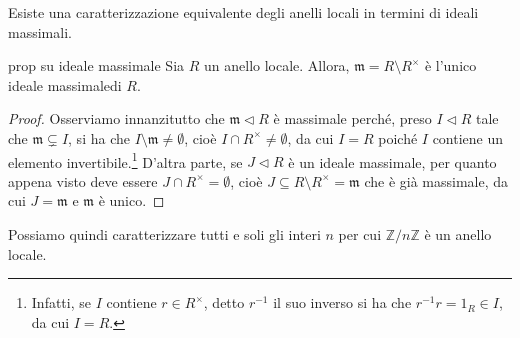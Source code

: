\noindent Esiste una caratterizzazione equivalente degli anelli locali in termini di ideali massimali.

\begin{prop}[1.7.8]{prop su ideale massimale}
  Sia $R$ un anello locale. Allora, $\mathfrak{m}=R\setminus R^{\times}$ è l'unico ideale massimale\footnotemark di $R$.
\end{prop}
\vspace{-4mm}
\begin{proof}
  Osserviamo innanzitutto che $\mathfrak{m}\lhd R$ è massimale perché, preso $I\lhd R$ tale che $\mathfrak{m} \varsubsetneq I$, 
  si ha che $I\setminus \mathfrak{m}\neq \emptyset$, cioè $I\cap R^{\times}\neq \emptyset$, da cui $I=R$ poiché $I$ contiene un elemento 
  invertibile.\footnote{Infatti, se $I$ contiene $r\in R^{\times}$, detto $r^{-1}$ il suo inverso si ha che $r^{-1}r=1_R\in I$, da cui $I=R$.} 
  D'altra parte, se $J\lhd R$ è un ideale massimale, per quanto appena visto deve essere $J\cap R^{\times}=\emptyset$, 
  cioè $J\subseteq R\setminus R^{\times}=\mathfrak{m}$ che è già massimale, da cui $J=\mathfrak{m}$ e $\mathfrak{m}$ è unico.
\end{proof}

\noindent Possiamo quindi caratterizzare tutti e soli gli interi $n$ per cui $\mathbb{Z}/n\mathbb{Z}$ è un anello locale.

